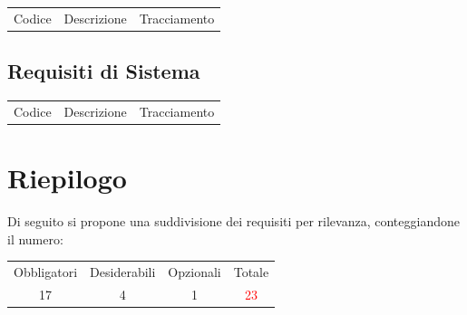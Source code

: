 \setlength{\arrayrulewidth}{0.5mm}
\renewcommand{\arraystretch}{2.5}

\begin{table}[h]
\centering
{}
\begin{tabular}{ |>{\centering\arraybackslash}p{1cm}|>{\centering\arraybackslash}p{9cm}|>{\centering\arraybackslash}p{5cm}| }
\hline
\multicolumn{3}{|c|}{\Large Requisiti di Qualità} \\
\hline
Codice & Descrizione & Tracciamento\\
\hline
\hline
\end{tabular}
\end{table}
\newpage

\subsection{Requisiti di Sistema}

\setlength{\arrayrulewidth}{0.5mm}
\renewcommand{\arraystretch}{2.5}

\begin{table}[h]
\centering
{}
\begin{tabular}{ |>{\centering\arraybackslash}p{1cm}|>{\centering\arraybackslash}p{9cm}|>{\centering\arraybackslash}p{5cm}| }
\hline
\multicolumn{3}{|c|}{\Large Requisiti di Sistema} \\
\hline
Codice & Descrizione & Tracciamento\\
\hline
\hline
\end{tabular}
\end{table}

\section{Riepilogo}
Di seguito si propone una suddivisione dei requisiti per rilevanza, conteggiandone il numero:

\begin{center}
\begin{tabular}{ c c c c }
 Obbligatori & Desiderabili & Opzionali & Totale \\ 
 17 & 4 & 1 & \textcolor{red}{23}
\end{tabular}
\end{center}
